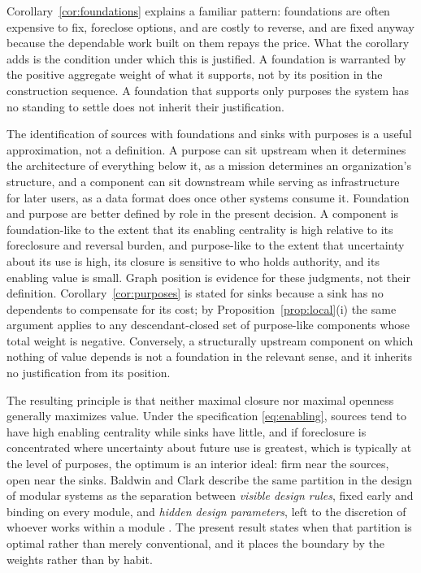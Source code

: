 Corollary~\ref{cor:foundations} explains a familiar pattern: foundations are often expensive to fix, foreclose options, and are costly to reverse, and are fixed anyway because the dependable work built on them repays the price. What the corollary adds is the condition under which this is justified. A foundation is warranted by the positive aggregate weight of what it supports, not by its position in the construction sequence. A foundation that supports only purposes the system has no standing to settle does not inherit their justification.

The identification of sources with foundations and sinks with purposes is a useful approximation, not a definition. A purpose can sit upstream when it determines the architecture of everything below it, as a mission determines an organization's structure, and a component can sit downstream while serving as infrastructure for later users, as a data format does once other systems consume it. Foundation and purpose are better defined by role in the present decision. A component is foundation-like to the extent that its enabling centrality is high relative to its foreclosure and reversal burden, and purpose-like to the extent that uncertainty about its use is high, its closure is sensitive to who holds authority, and its enabling value is small. Graph position is evidence for these judgments, not their definition. Corollary~\ref{cor:purposes} is stated for sinks because a sink has no dependents to compensate for its cost; by Proposition~\ref{prop:local}(i) the same argument applies to any descendant-closed set of purpose-like components whose total weight is negative. Conversely, a structurally upstream component on which nothing of value depends is not a foundation in the relevant sense, and it inherits no justification from its position.

The resulting principle is that neither maximal closure nor maximal openness generally maximizes value. Under the specification \eqref{eq:enabling}, sources tend to have high enabling centrality while sinks have little, and if foreclosure is concentrated where uncertainty about future use is greatest, which is typically at the level of purposes, the optimum is an interior ideal: firm near the sources, open near the sinks. Baldwin and Clark describe the same partition in the design of modular systems as the separation between \emph{visible design rules}, fixed early and binding on every module, and \emph{hidden design parameters}, left to the discretion of whoever works within a module \cite{baldwinclark2000}. The present result states when that partition is optimal rather than merely conventional, and it places the boundary by the weights rather than by habit.

